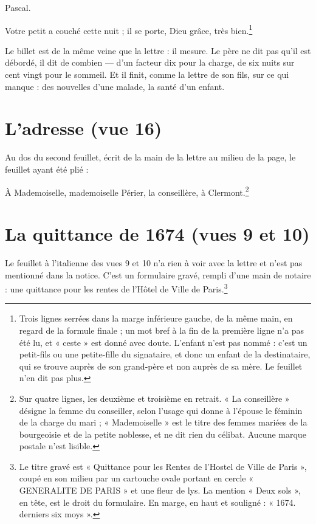 \documentclass[11pt,a4paper]{article}
\begin{document}
Pascal.

Votre petit a couché cette nuit ; il se porte, Dieu grâce, très
bien.\footnote{Trois lignes serrées dans la marge inférieure gauche, de la
même main, en regard de la formule finale ; un mot bref à la fin de la
première ligne n'a pas été lu, et « ceste » est donné avec doute. L'enfant
n'est pas nommé : c'est un petit-fils ou une petite-fille du signataire, et
donc un enfant de la destinataire, qui se trouve auprès de son grand-père et
non auprès de sa mère. Le feuillet n'en dit pas plus.}

Le billet est de la même veine que la lettre : il mesure. Le père ne dit pas
qu'il est débordé, il dit de combien — d'un facteur dix pour la charge, de six
nuits sur cent vingt pour le sommeil. Et il finit, comme la lettre de son
fils, sur ce qui manque : des nouvelles d'une malade, la santé d'un enfant.

\section*{L'adresse (vue 16)}

Au dos du second feuillet, écrit de la main de la lettre au milieu de la page,
le feuillet ayant été plié :

À Mademoiselle, mademoiselle Périer, la conseillère, à
Clermont.\footnote{Sur quatre lignes, les deuxième et troisième en retrait.
« La conseillère » désigne la femme du conseiller, selon l'usage qui donne à
l'épouse le féminin de la charge du mari ; « Mademoiselle » est le titre des
femmes mariées de la bourgeoisie et de la petite noblesse, et ne dit rien du
célibat. Aucune marque postale n'est lisible.}

\section*{La quittance de 1674 (vues 9 et 10)}

Le feuillet à l'italienne des vues 9 et 10 n'a rien à voir avec la lettre et
n'est pas mentionné dans la notice. C'est un formulaire gravé, rempli d'une
main de notaire : une quittance pour les rentes de l'Hôtel de Ville de
Paris.\footnote{Le titre gravé est « Quittance pour les Rentes de l'Hostel de
Ville de Paris », coupé en son milieu par un cartouche ovale portant en cercle
« GENERALITE DE PARIS » et une fleur de lys. La mention « Deux sols », en
tête, est le droit du formulaire. En marge, en haut et souligné : « 1674.
derniers six moys ».}
\end{document}
